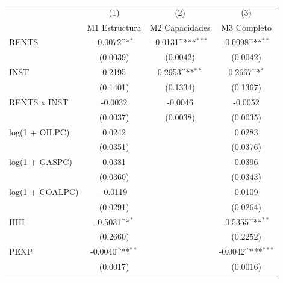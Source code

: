 {
\def\sym#1{\ifmmode^{#1}\else\(^{#1}\)\fi}
\begin{tabular}{l*{3}{c}}
\toprule
                    &\multicolumn{1}{c}{(1)}&\multicolumn{1}{c}{(2)}&\multicolumn{1}{c}{(3)}\\
                    &\multicolumn{1}{c}{M1 Estructura}&\multicolumn{1}{c}{M2 Capacidades}&\multicolumn{1}{c}{M3 Completo}\\
\midrule
RENTS               &     -0.0072\sym{*}  &     -0.0131\sym{***}&     -0.0098\sym{**} \\
                    &    (0.0039)         &    (0.0042)         &    (0.0042)         \\
\addlinespace
INST                &      0.2195         &      0.2953\sym{**} &      0.2667\sym{*}  \\
                    &    (0.1401)         &    (0.1334)         &    (0.1367)         \\
\addlinespace
RENTS x INST        &     -0.0032         &     -0.0046         &     -0.0052         \\
                    &    (0.0037)         &    (0.0038)         &    (0.0035)         \\
\addlinespace
log(1 + OILPC)      &      0.0242         &                     &      0.0283         \\
                    &    (0.0351)         &                     &    (0.0376)         \\
\addlinespace
log(1 + GASPC)      &      0.0381         &                     &      0.0396         \\
                    &    (0.0360)         &                     &    (0.0343)         \\
\addlinespace
log(1 + COALPC)     &     -0.0119         &                     &      0.0109         \\
                    &    (0.0291)         &                     &    (0.0264)         \\
\addlinespace
HHI                 &     -0.5031\sym{*}  &                     &     -0.5355\sym{**} \\
                    &    (0.2660)         &                     &    (0.2252)         \\
\addlinespace
PEXP                &     -0.0040\sym{**} &                     &     -0.0042\sym{***}\\
                    &    (0.0017)         &                     &    (0.0016)         \\
\addlinespace

\end{tabular}}
